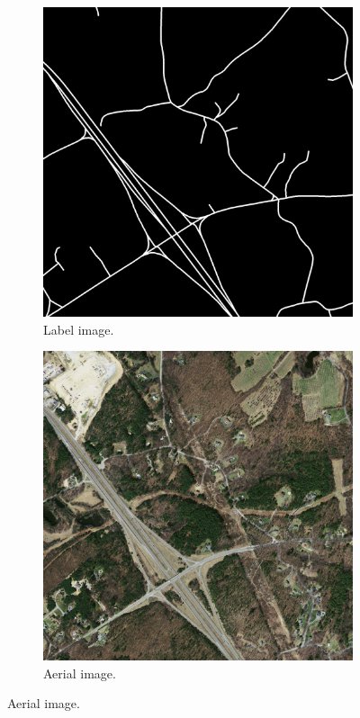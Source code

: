 \begin{figure}
\begin{subfigure}{0.48\textwidth}
\includegraphics[width=\textwidth]{figs/E7/E7-label.jpg}
\caption{Label image.} \label{fig:E7_label_iamge}
\vspace{0.5cm} %
\end{subfigure}
\hspace*{\fill} %
\begin{subfigure}{0.48\textwidth}
\includegraphics[width=\textwidth]{figs/E7/E7-image.jpg}
\caption{Aerial image.} \label{fig:E7_aerial_image}
\vspace{0.5cm} %
\end{subfigure}


\end{figure}
